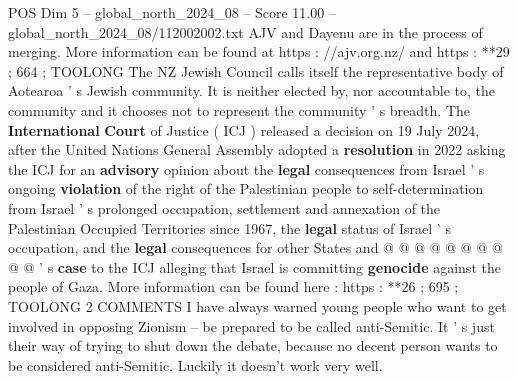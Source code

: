 \begin{textsample}{POS Dim 5 – global\_north\_2024\_08 – Score 11.00 – global\_north\_2024\_08/112002002.txt}
AJV and Dayenu are in the process of merging.
More information can be found at https : //ajv.org.nz/ and https : **29 ; 664 ; TOOLONG The NZ Jewish Council calls itself the representative body of Aotearoa ' s Jewish community.
It is neither elected by, nor accountable to, the community and it chooses not to represent the community ' s breadth.
The \textbf{International} \textbf{Court} of Justice ( ICJ ) released a decision on 19 July 2024, after the United Nations General Assembly adopted a \textbf{resolution} in 2022 asking the ICJ for an \textbf{advisory} opinion about the \textbf{legal} consequences from Israel ' s ongoing \textbf{violation} of the right of the Palestinian people to self-determination from Israel ' s prolonged occupation, settlement and annexation of the Palestinian Occupied Territories since 1967, the \textbf{legal} status of Israel ' s occupation, and the \textbf{legal} consequences for other States and @ @ @ @ @ @ @ @ @ @ ' s \textbf{case} to the ICJ alleging that Israel is committing \textbf{genocide} against the people of Gaza.
More information can be found here : https : **26 ; 695 ; TOOLONG 2 COMMENTS I have always warned young people who want to get involved in opposing Zionism -- be prepared to be called anti-Semitic.
It ' s just their way of trying to shut down the debate, because no decent person wants to be considered anti-Semitic.
Luckily it doesn't work very well.

\end{textsample}
